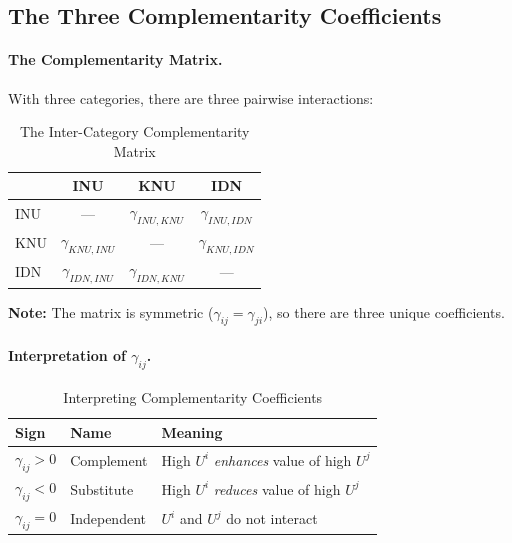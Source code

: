 \subsection{The Three Complementarity Coefficients}

\paragraph{The Complementarity Matrix.}
With three categories, there are three pairwise interactions:

\begin{table}[htbp]
\centering
\caption{The Inter-Category Complementarity Matrix}
\label{tab:app-c-complementarity-matrix}
\renewcommand{\arraystretch}{1.4}
\begin{tabular}{@{}l|ccc@{}}
\toprule
& INU & KNU & IDN \\
\midrule
INU & --- & $\gamma_{INU,KNU}$ & $\gamma_{INU,IDN}$ \\
KNU & $\gamma_{KNU,INU}$ & --- & $\gamma_{KNU,IDN}$ \\
IDN & $\gamma_{IDN,INU}$ & $\gamma_{IDN,KNU}$ & --- \\
\bottomrule
\end{tabular}
\end{table}

\textbf{Note:} The matrix is symmetric ($\gamma_{ij} = \gamma_{ji}$), so there are 
three unique coefficients.

\paragraph{Interpretation of $\gamma_{ij}$.}

\begin{table}[htbp]
\centering
\caption{Interpreting Complementarity Coefficients}
\label{tab:app-c-gamma-interpretation}
\renewcommand{\arraystretch}{1.3}
\begin{tabular}{@{}lll@{}}
\toprule
\textbf{Sign} & \textbf{Name} & \textbf{Meaning} \\
\midrule
$\gamma_{ij} > 0$ & Complement & High $U^i$ \emph{enhances} value of high $U^j$ \\
$\gamma_{ij} < 0$ & Substitute & High $U^i$ \emph{reduces} value of high $U^j$ \\
$\gamma_{ij} = 0$ & Independent & $U^i$ and $U^j$ do not interact \\
\bottomrule
\end{tabular}
\end{table}

